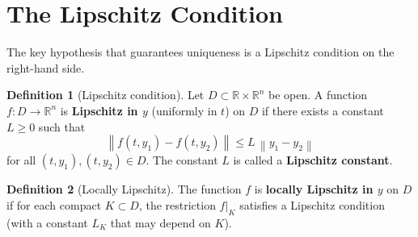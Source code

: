 \documentclass[12pt,a4paper,openany]{book}
\theoremstyle{definition}
\newtheorem{definition}{Definition}[chapter]
\theoremstyle{plain}
\theoremstyle{remark}
\newcommand{\R}{\mathbb{R}}
\newcommand{\norm}[1]{\left\|#1\right\|}
\begin{document}
\begin{center}
\end{center}

\section{The Lipschitz Condition}\label{sec:lipschitz}

The key hypothesis that guarantees uniqueness is a Lipschitz condition on
the right-hand side.

\begin{definition}[Lipschitz condition]\label{def:lipschitz}
Let $D \subset \R \times \R^n$ be open. A function $f\colon D \to \R^n$ is
\textbf{Lipschitz in $y$} (uniformly in $t$) on $D$ if there exists a constant
$L \ge 0$ such that
\[
  \norm{f(t,y_1) - f(t,y_2)} \le L\,\norm{y_1 - y_2}
\]
for all $(t,y_1), (t,y_2) \in D$. The constant $L$ is called a
\textbf{Lipschitz constant}.
\end{definition}

\begin{definition}[Locally Lipschitz]\label{def:locally-lipschitz}
The function $f$ is \textbf{locally Lipschitz in $y$} on $D$ if for each
compact $K \subset D$, the restriction $f|_K$ satisfies a Lipschitz condition
(with a constant $L_K$ that may depend on $K$).
\end{definition}
\end{document}
